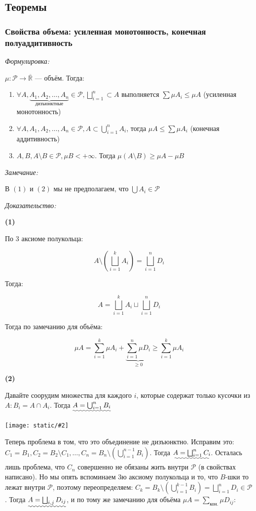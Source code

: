 \documentclass{article}
\def\images#1#2{\begin{center}\texttt{[image: static/\#2]}\end{center}}
\begin{document}
\subsection{Теоремы}

\subsubsection{Свойства объема: усиленная монотонность, конечная полуаддитивность}

\textit{Формулировка:}

$\mu: \mathcal{P} \rightarrow \overline{\mathbb{R}}$ --- объём. Тогда: 

\begin{enumerate}
    \item $\forall A, \underbrace{A_1, A_2, \ldots, A_n}_{\text{дизъюнктные}} \in \mathcal{P}, \bigsqcup_{i = 1}^{n} \subset A$ выполняется $\sum \mu A_i \le \mu A$ (усиленная монотонность)
    \item $\forall A, A_1, A_2, \ldots, A_n \in \mathcal{P}, A \subset \bigcup_{i = 1}^{n} A_i$, тогда $\mu A \le \sum \mu A_i$ (конечная аддитивность)
    \item $A, B, A \setminus B \in \mathcal{P}, \mu B < +\infty$. Тогда $\mu(A \setminus B) \ge \mu A - \mu B$
\end{enumerate}

\textit{Замечание:}

В $(1)$ и $(2)$ мы не предполагаем, что $\bigcup A_i \in \mathcal{P}$

\textit{Доказательство:}

\textbf{(1)}

По 3 аксиоме полукольца: 

\[A \setminus \left(\bigsqcup_{i = 1}^{k} A_{i}\right) = \bigsqcup_{i = 1}^{n} D_{i}\]

Тогда: 

\[A = \bigsqcup_{i = 1}^{k} A_i \sqcup \bigsqcup_{i = 1}^{n} D_i\]

Тогда по замечанию для объёма: 

\[\mu A = \sum_{i = 1}^{k} \mu A_i + \underbrace{\sum_{i = 1}^{n} \mu D_i}_{\ge 0} \ge \sum_{i = 1}^{k} \mu A_i\]

\textbf{(2)}

Давайте соорудим множества для каждого $i$, которые содержат только кусочки из $A: B_i = A \cap A_i$. Тогда $\uwave{A = \bigcup_{i = 1}^{n} B_i}$

\images{0.3}{sv_ob.png}

Теперь проблема в том, что это объединение не дизъюнктно. Исправим это: $C_1 = B_1, C_2 = B_2 \setminus C_1, \ldots, C_n = B_n \setminus (\bigcup_{i = 1}^{n - 1} B_{i})$. Тогда $\uwave{A = \bigsqcup_{i = 1}^{n} C_i}$. Осталась лишь проблема, что $C_n$ совершенно не обязаны жить внутри $\mathcal{P}$ (в свойствах написано). Но мы опять вспоминаем 3ю аксиому полукольца и то, что $B$-шки то лежат внутри $\mathcal{P}$, поэтому переопределяем: $C_k = B_k \setminus (\bigcup_{i = 1}^{k - 1} B_{i}) = \bigsqcup_{i = 1}^{n} D_i \in \mathcal{P}$. Тогда $\uwave{A = \bigsqcup_{i, j} D_{ij}}$, и по тому же замечанию для объёма $\mu A = \sum_{\text{кон.}}\mu D_{ij}$: 
\end{document}
